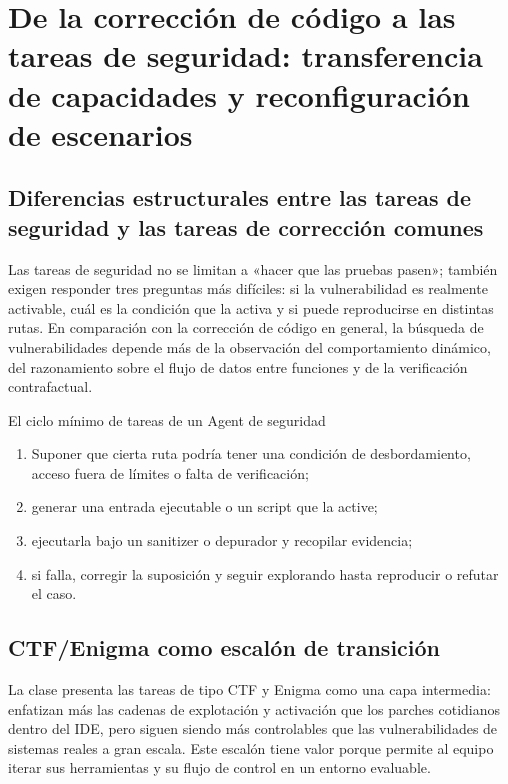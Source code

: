 \section{De la corrección de código a las tareas de seguridad: transferencia de capacidades y reconfiguración de escenarios}

\subsection{Diferencias estructurales entre las tareas de seguridad y las tareas de corrección comunes}
Las tareas de seguridad no se limitan a «hacer que las pruebas pasen»; también exigen responder tres preguntas más difíciles: si la vulnerabilidad es realmente activable, cuál es la condición que la activa y si puede reproducirse en distintas rutas. En comparación con la corrección de código en general, la búsqueda de vulnerabilidades depende más de la observación del comportamiento dinámico, del razonamiento sobre el flujo de datos entre funciones y de la verificación contrafactual.

\begin{knowledgebox}{El ciclo mínimo de tareas de un Agent de seguridad}
\begin{enumerate}
    \item Suponer que cierta ruta podría tener una condición de desbordamiento, acceso fuera de límites o falta de verificación;
    \item generar una entrada ejecutable o un script que la active;
    \item ejecutarla bajo un sanitizer o depurador y recopilar evidencia;
    \item si falla, corregir la suposición y seguir explorando hasta reproducir o refutar el caso.
\end{enumerate}
\end{knowledgebox}

\subsection{CTF/Enigma como escalón de transición}
La clase presenta las tareas de tipo CTF y Enigma como una capa intermedia: enfatizan más las cadenas de explotación y activación que los parches cotidianos dentro del IDE, pero siguen siendo más controlables que las vulnerabilidades de sistemas reales a gran escala. Este escalón tiene valor porque permite al equipo iterar sus herramientas y su flujo de control en un entorno evaluable.

